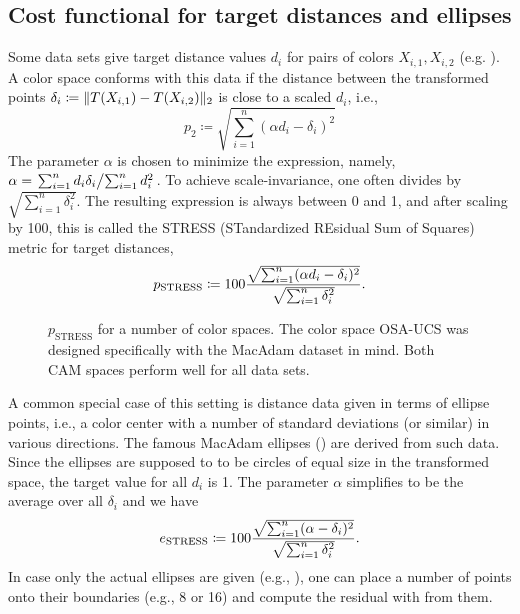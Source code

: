 \documentclass{scrartcl}
\theoremstyle{named}
\DeclarePairedDelimiter{\norm}{\lVert}{\rVert}
\begin{document}
\subsection{Cost functional for target distances and ellipses}

Some data sets give target distance values $d_i$ for pairs of colors $X_{i,1}, X_{i,2}$
(e.g. \cite{macadam1974}). A color space conforms with this data if the distance
between the transformed points
$\delta_i \coloneqq \norm{T(X_{i,1}) - T(X_{i,2})}_2$
is close to a scaled $d_i$, i.e.,
\begin{equation}\label{eq:p}
  p_2
  \coloneqq \sqrt{\sum_{i=1}^n (\alpha d_i - \delta_i)^2}
\end{equation}
The parameter $\alpha$ is chosen to minimize the expression, namely, $\alpha =
\left.\sum_{i=1}^n d_i \delta_i \middle/ \sum_{i=1}^n d_i^2\right.$.
To achieve scale-invariance, one often divides by
$\sqrt{\sum_{i=1}^n \delta_i^2}$.
The resulting expression is always between 0 and 1, and after scaling by 100, this is
called the STRESS (STandardized REsidual Sum of Squares) metric for target distances,
\begin{equation}\label{eq:p}
  p_{\text{STRESS}}
  \coloneqq
  100
  \frac{%
    \sqrt{\sum_{i=1}^n (\alpha d_i - \delta_i)^2}
  }{
    \sqrt{\sum_{i=1}^n \delta_i^2}
  }.
\end{equation}

\begin{figure}
  \centering
  
  \caption{$p_\text{STRESS}$ for a number of color spaces. The color space OSA-UCS was
  designed specifically with the MacAdam \cite{macadam1974} dataset in mind. Both CAM
  spaces perform well for all data sets.}
\end{figure}

A common special case of this setting is distance data given in terms of ellipse points,
i.e., a color center with a number of standard deviations (or similar) in various
directions. The famous MacAdam ellipses (\cite{macadam1942}) are derived from such data.
Since the ellipses are supposed to to be circles of equal size in the transformed space,
the target value for all $d_i$ is 1. The parameter $\alpha$ simplifies to be the average
over all $\delta_i$ and we have
\begin{equation}\label{eq:e}
  e_{\text{STRESS}}
  \coloneqq
  100
  \frac{%
    \sqrt{\sum_{i=1}^n (\alpha - \delta_{i})^2}
  }{
    \sqrt{\sum_{i=1}^n \delta_i^2}
  }.
\end{equation}
In case only the actual ellipses are given (e.g., \cite{luorigg}), one can place a
number of points onto their boundaries (e.g., 8 or 16) and compute the residual with
from them.
\end{document}
